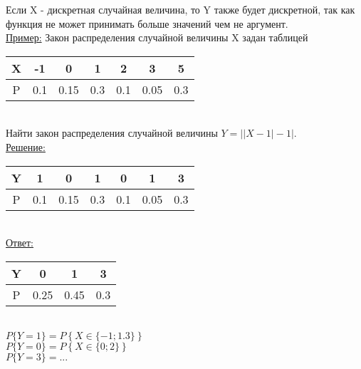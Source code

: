 
Если X - дискретная случайная величина, то Y также будет дискретной, так как функция не может принимать больше значений чем не аргумент.\\


\underline{Пример:} Закон распределения случайной величины X задан таблицей\\

\begin{tabular}{|c||c|c|c|c|c|c|}
\hline 
X & -1 & 0 & 1 & 2 & 3 & 5 \\ 
\hline 
P & 0.1 & 0.15 & 0.3 & 0.1 & 0.05 & 0.3 \\ 
\hline 
\end{tabular} 
\\
Найти закон распределения случайной величины $Y = \left| |X - 1| - 1 \right|$.\\
\underline{Решение:}\\

\begin{tabular}{|c||c|c|c|c|c|c|}
\hline 
Y & 1 & 0 & 1 & 0 & 1 & 3 \\ 
\hline 
P & 0.1 & 0.15 & 0.3 & 0.1 & 0.05 & 0.3 \\ 
\hline 
\end{tabular}  \\

\underline{Ответ:} \\

\begin{tabular}{|c||c|c|c|}
\hline 
Y & 0 & 1 & 3 \\ 
\hline 
P & 0.25 & 0.45 & 0.3 \\ 
\hline 
\end{tabular} \\

$P\{Y = 1\} = P\left\{ X \in \{-1; 1.3\} \right\}$\\
$P\{Y = 0\} = P\left\{ X \in \{0; 2\} \right\}$\\
$P\{Y = 3\} = ...$\\










































